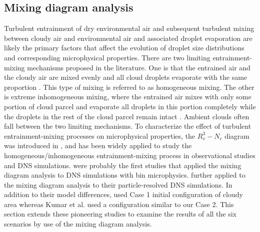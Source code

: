 \documentclass[draft,jgrga]{AGUTeX}
\begin{document}
\begin{article}
\subsection{Mixing diagram analysis}
Turbulent entrainment of dry environmental air and subsequent turbulent mixing between cloudy air and environmental air and associated droplet evaporation are likely the primary factors that affect the evolution of droplet size distributions and corresponding microphysical properties. There are two limiting entrainment-mixing mechanisms proposed in the literature. One is that the entrained air and the cloudy air are mixed evenly and all cloud droplets evaporate with the same proportion \cite{Warner1973}. This type of mixing is referred to as homogeneous mixing. The other is extreme inhomogeneous mixing, where the entrained air mixes with only some portion of cloud parcel and evaporate all droplets in this portion completely while the droplets in the rest of the cloud parcel remain intact \cite{Baker1980}. Ambient clouds often fall between the two limiting mechanisms. To characterize the effect of turbulent entrainment-mixing processes on microphysical properties, the $R_v^3-N_c$ diagram was introduced in \cite{Burnet2007Observational}, and has been widely applied to study the homogeneous/inhomogeneous entrainment-mixing process in observational studies and DNS simulations. \cite{And04, And06, And09} were probably the first studies that applied the mixing diagram analysis to DNS simulations with bin microphysics. \cite{Kumar14} further applied to the mixing diagram analysis to their particle-resolved DNS simulations. In addition to their model differences,  \cite{And04, And06, And09} used Case 1 initial configuration of cloudy area whereas Kumar et al. used a configuration similar to our Case 2. This section extends these pioneering studies to examine the results of all the six scenarios by use of the mixing diagram analysis.


\end{article}
\end{document}
